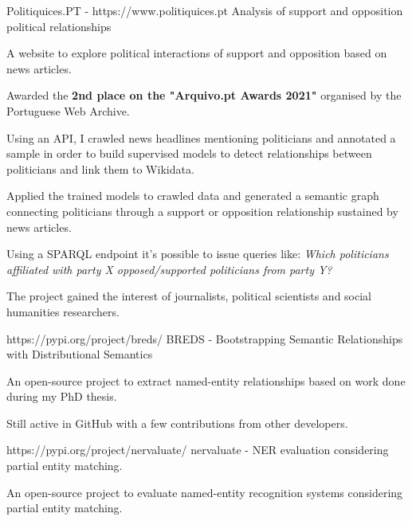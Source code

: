 

\begin{cventries}
  \cventry
    {Politiquices.PT - https://www.politiquices.pt} %
    {Analysis of support and opposition political relationships} %
    {} %
    {} %
    {
      \begin{cvitems} %
        \item {A website to explore political interactions of support and opposition based on news articles.}
		\item {Awarded the \textbf{2nd place on the "Arquivo.pt Awards 2021"} organised by the Portuguese Web Archive.}
		\item {Using an API, I crawled news headlines mentioning politicians and annotated a sample in order to build supervised models to detect relationships between politicians and link them to Wikidata.}
		\item {Applied the trained models to crawled data and generated a semantic graph connecting politicians through a support or opposition relationship sustained by news articles.}
		\item {Using a SPARQL endpoint it's possible to issue queries like: \textit{Which politicians affiliated with party X opposed/supported politicians from party Y?}}
		\item {The project gained the interest of journalists, political scientists and social humanities researchers.}
      \end{cvitems}
    }
 \cventry
   {https://pypi.org/project/breds/} %
   {BREDS - Bootstrapping Semantic Relationships with Distributional Semantics} %
   {} %
   {} %
   {
     \begin{cvitems} %
     	\item {An open-source project to extract named-entity relationships based on work done during my PhD thesis.}
		\item {Still active in GitHub with a few contributions from other developers.}
     \end{cvitems}
   }
 \cventry
   {https://pypi.org/project/nervaluate/} %
   {nervaluate - NER evaluation considering partial entity matching.} %
   {} %
   {} %
   {
     \begin{cvitems} %
     	\item {An open-source project to evaluate named-entity recognition systems considering partial entity matching.}
      \end{cvitems}
   }	  
\end{cventries}
